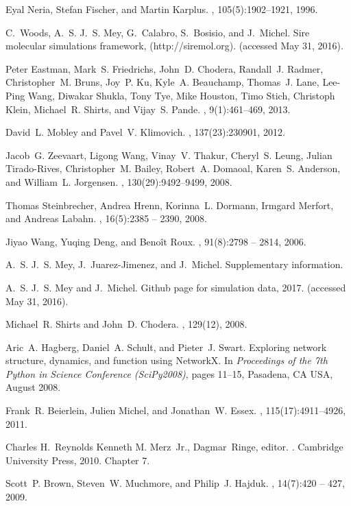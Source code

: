 \documentclass{svjour3}                     %
\begin{document}
\begin{thebibliography}{10}
Eyal Neria, Stefan Fischer, and Martin Karplus.
, 105(5):1902--1921, 1996.

C.~Woods, A.~S. J.~S. Mey, G.~Calabro, S.~Bosisio, and J.~Michel.
\newblock Sire molecular simulations framework, (http://siremol.org).
\newblock (accessed May 31, 2016).

Peter Eastman, Mark~S. Friedrichs, John~D. Chodera, Randall~J. Radmer,
  Christopher~M. Bruns, Joy~P. Ku, Kyle~A. Beauchamp, Thomas~J. Lane, Lee-Ping
  Wang, Diwakar Shukla, Tony Tye, Mike Houston, Timo Stich, Christoph Klein,
  Michael~R. Shirts, and Vijay~S. Pande.
, 9(1):461--469, 2013.

David~L. Mobley and Pavel~V. Klimovich.
, 137(23):230901, 2012.

Jacob~G. Zeevaart, Ligong Wang, Vinay~V. Thakur, Cheryl~S. Leung, Julian
  Tirado-Rives, Christopher~M. Bailey, Robert~A. Domaoal, Karen~S. Anderson,
  and William~L. Jorgensen.
, 130(29):9492--9499, 2008.

Thomas Steinbrecher, Andrea Hrenn, Korinna~L. Dormann, Irmgard Merfort, and
  Andreas Labahn.
, 16(5):2385 -- 2390, 2008.

Jiyao Wang, Yuqing Deng, and Benoît Roux.
, 91(8):2798 -- 2814, 2006.

A.~S. J.~S. Mey, J.~Juarez-Jimenez, and J.~Michel.
\newblock Supplementary information.

A.~S. J.~S. Mey and J.~Michel.
\newblock Github page for simulation data, 2017.
\newblock (accessed May 31, 2016).

Michael~R. Shirts and John~D. Chodera.
, 129(12), 2008.

Aric~A. Hagberg, Daniel~A. Schult, and Pieter~J. Swart.
\newblock Exploring network structure, dynamics, and function using {NetworkX}.
\newblock In {\em Proceedings of the 7th Python in Science Conference
  (SciPy2008)}, pages 11--15, Pasadena, CA USA, August 2008.

Frank~R. Beierlein, Julien Michel, and Jonathan~W. Essex.
, 115(17):4911--4926, 2011.

Charles H.~Reynolds Kenneth M. Merz~Jr., Dagmar~Ringe, editor.
.
\newblock Cambridge University Press, 2010.
\newblock Chapter 7.

Scott~P. Brown, Steven~W. Muchmore, and Philip~J. Hajduk.
, 14(7):420 -- 427, 2009.

\end{thebibliography}
\end{document}

